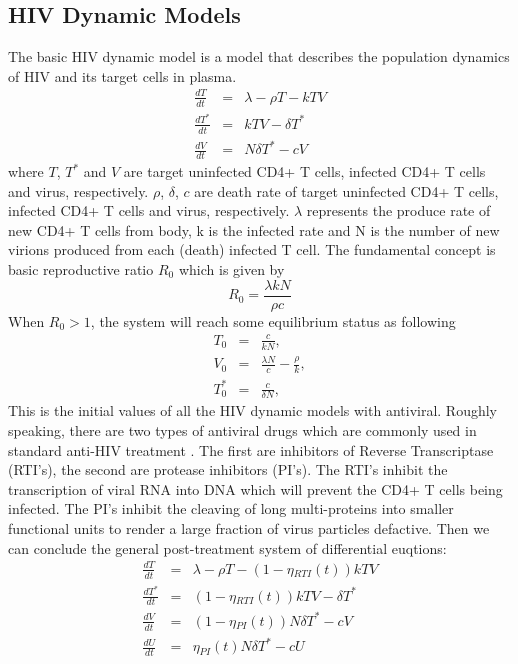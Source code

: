 \documentclass[12pt]{extarticle}
\begin{document}
\subsection{HIV Dynamic Models}
\label{sect:hiv}
The basic HIV dynamic model is a model that describes the population dynamics of HIV and its target cells in plasma.
\begin{equation}
\begin{array}{rcl}
\frac{dT}{dt} & = & \lambda{}-\rho{}T-kTV \\
\frac{dT^{*}}{dt} & = & kTV-\delta{}T^{*} \\
\frac{dV}{dt} & = & N\delta{}T^{*}-cV
\end{array}
\end{equation}
where $T$, $T^{*}$ and $V$ are target uninfected CD4+ T cells, infected CD4+ T cells and virus, respectively.  $\rho$, $\delta$, $c$ are death rate of target uninfected CD4+ T cells, infected CD4+ T cells and virus, respectively. $\lambda$ represents the produce rate of new CD4+ T cells from body, k is the infected rate and N is the number of new virions produced from each (death) infected T cell.
The fundamental concept is basic reproductive ratio $R_{0}$ \cite{Putter02} which is given by
\begin{equation}
R_{0}=\frac{\lambda{}kN}{\rho{}c}
\end{equation}
When $R_{0}>1$, the system will reach some equilibrium status as following
\begin{equation}
\begin{array}{rcl}
T_{0} & = & \frac{c}{kN}, \\
V_{0} & = & \frac{\lambda{}N}{c}-\frac{\rho}{k}, \\
T_{0}^{*} & = & \frac{c}{\delta{}N}, 
\end{array}
\end{equation}
This is the initial values of all the HIV dynamic models with antiviral. Roughly speaking, there are two types of antiviral drugs which are commonly used in standard anti-HIV treatment \cite{Putter02}. The first are inhibitors of Reverse Transcriptase (RTI's), the second are protease inhibitors (PI's). The RTI's inhibit the transcription of viral RNA into DNA which will prevent the CD4+ T cells being infected. The PI's inhibit the cleaving of long multi-proteins into smaller functional units to render a large fraction of virus particles defactive. Then we can conclude the general post-treatment system of differential euqtions:
\begin{equation}
\begin{array}{rcl}
\frac{dT}{dt} & = & \lambda{}-\rho{}T-(1-\eta{}_{RTI}(t))kTV \\
\frac{dT^{*}}{dt} & = & (1-\eta{}_{RTI}(t))kTV-\delta{}T^{*} \\
\frac{dV}{dt} & = & (1-\eta{}_{PI}(t))N\delta{}T^{*}-cV \\
\frac{dU}{dt} & = & \eta{}_{PI}(t)N\delta{}T^{*}-cU \label{generalmodel}
\end{array}
\end{equation}
\end{document}
